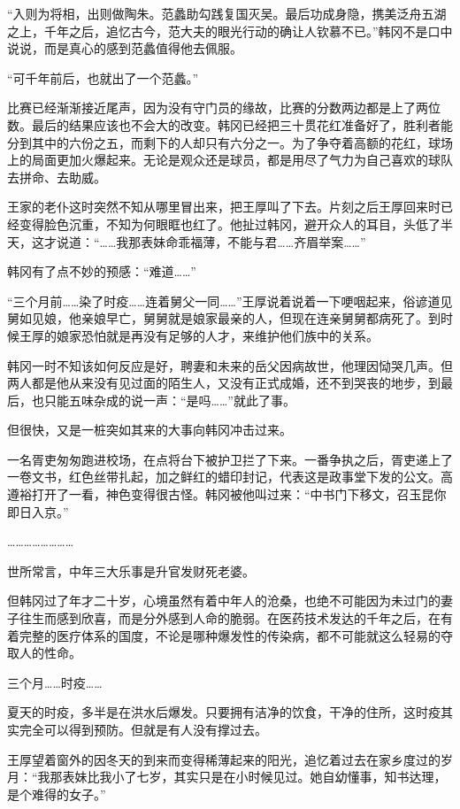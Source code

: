 “入则为将相，出则做陶朱。范蠡助勾践复国灭吴。最后功成身隐，携美泛舟五湖之上，千年之后，追忆古今，范大夫的眼光行动的确让人钦慕不已。”韩冈不是口中说说，而是真心的感到范蠡值得他去佩服。

“可千年前后，也就出了一个范蠡。”

比赛已经渐渐接近尾声，因为没有守门员的缘故，比赛的分数两边都是上了两位数。最后的结果应该也不会大的改变。韩冈已经把三十贯花红准备好了，胜利者能分到其中的六份之五，而剩下的人却只有六分之一。为了争夺着高额的花红，球场上的局面更加火爆起来。无论是观众还是球员，都是用尽了气力为自己喜欢的球队去拼命、去助威。

王家的老仆这时突然不知从哪里冒出来，把王厚叫了下去。片刻之后王厚回来时已经变得脸色沉重，不知为何眼眶也红了。他扯过韩冈，避开众人的耳目，头低了半天，这才说道：“……我那表妹命乖福薄，不能与君……齐眉举案……”

韩冈有了点不妙的预感：“难道……”

“三个月前……染了时疫……连着舅父一同……”王厚说着说着一下哽咽起来，俗谚道见舅如见娘，他亲娘早亡，舅舅就是娘家最亲的人，但现在连亲舅舅都病死了。到时候王厚的娘家恐怕就是再没有足够的人才，来维护他们族中的关系。

韩冈一时不知该如何反应是好，聘妻和未来的岳父因病故世，他理因恸哭几声。但两人都是他从来没有见过面的陌生人，又没有正式成婚，还不到哭丧的地步，到最后，也只能五味杂成的说一声：“是吗……”就此了事。

但很快，又是一桩突如其来的大事向韩冈冲击过来。

一名胥吏匆匆跑进校场，在点将台下被护卫拦了下来。一番争执之后，胥吏递上了一卷文书，红色丝带扎起，加之鲜红的蜡印封记，代表这是政事堂下发的公文。高遵裕打开了一看，神色变得很古怪。韩冈被他叫过来：“中书门下移文，召玉昆你即日入京。”

……………………

世所常言，中年三大乐事是升官发财死老婆。

但韩冈过了年才二十岁，心境虽然有着中年人的沧桑，也绝不可能因为未过门的妻子往生而感到欣喜，而是分外感到人命的脆弱。在医药技术发达的千年之后，在有着完整的医疗体系的国度，不论是哪种爆发性的传染病，都不可能就这么轻易的夺取人的性命。

三个月……时疫……

夏天的时疫，多半是在洪水后爆发。只要拥有洁净的饮食，干净的住所，这时疫其实完全可以得到预防。但就是有人没有撑过去。

王厚望着窗外的因冬天的到来而变得稀薄起来的阳光，追忆着过去在家乡度过的岁月：“我那表妹比我小了七岁，其实只是在小时候见过。她自幼懂事，知书达理，是个难得的女子。”

